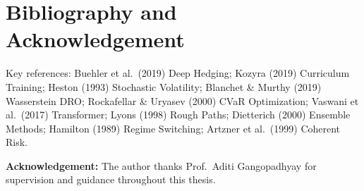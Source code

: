 \documentclass[11pt]{article}
\begin{document}
\section*{Bibliography and Acknowledgement}
\small
Key references: Buehler et al.\ (2019) Deep Hedging; Kozyra (2019) Curriculum Training; Heston (1993) Stochastic Volatility; Blanchet \& Murthy (2019) Wasserstein DRO; Rockafellar \& Uryasev (2000) CVaR Optimization; Vaswani et al.\ (2017) Transformer; Lyons (1998) Rough Paths; Dietterich (2000) Ensemble Methods; Hamilton (1989) Regime Switching; Artzner et al.\ (1999) Coherent Risk.

\medskip
\textbf{Acknowledgement:} The author thanks Prof.\ Aditi Gangopadhyay for supervision and guidance throughout this thesis.

\medskip
\begin{center}
\end{center}
\end{document}
